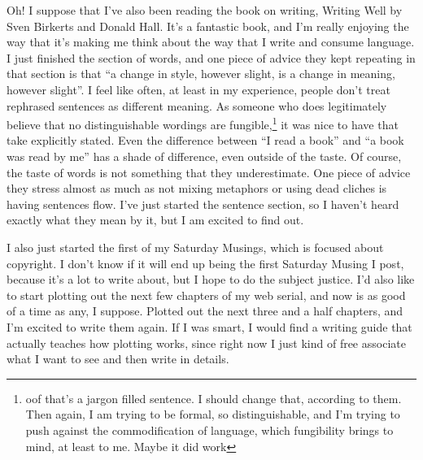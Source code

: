\documentclass[12pt]{article}[titlepage]
\newcommand{\say}[1]{``#1''}
\newcommand{\1}{\={a}}
\newcommand{\2}{\={e}}
\newcommand{\3}{\={\i}}
\newcommand{\4}{\=o}
\newcommand{\5}{\=u}
\newcommand{\6}{\={A}}
\renewcommand{\,}{\textsuperscript{,}}
\begin{document}
Oh! I suppose that I've also been reading the book on writing, Writing Well by Sven Birkerts and Donald Hall. It's a fantastic book, and I'm really enjoying the way that it's making me think about the way that I write and consume language.
I just finished the section of words, and one piece of advice they kept repeating in that section is that \say{a change in style, however slight, is a change in meaning, however slight}.
I feel like often, at least in my experience, people don't treat rephrased sentences as different meaning.
As someone who does legitimately believe that no distinguishable wordings are fungible,\footnote{oof that's a jargon filled sentence. I should change that, according to them. Then again, I am trying to be formal, so distinguishable, and I'm trying to push against the commodification of language, which fungibility brings to mind, at least to me. Maybe it did work} it was nice to have that take explicitly stated.
Even the difference between \say{I read a book} and \say{a book was read by me} has a shade of difference, even outside of the taste.
Of course, the taste of words is not something that they underestimate.
One piece of advice they stress almost as much as not mixing metaphors or using dead cliches is having sentences flow.
I've just started the sentence section, so I haven't heard exactly what they mean by it, but I am excited to find out.

I also just started the first of my Saturday Musings, which is focused about copyright. I don't know if it will end up being the first Saturday Musing I post, because it's a lot to write about, but I hope to do the subject justice.
I'd also like to start plotting out the next few chapters of my web serial, and now is as good of a time as any, I suppose.
Plotted out the next three and a half chapters, and I'm excited to write them again.
If I was smart, I would find a writing guide that actually teaches how plotting works, since right now I just kind of free associate what I want to see and then write in details.
\end{document}

